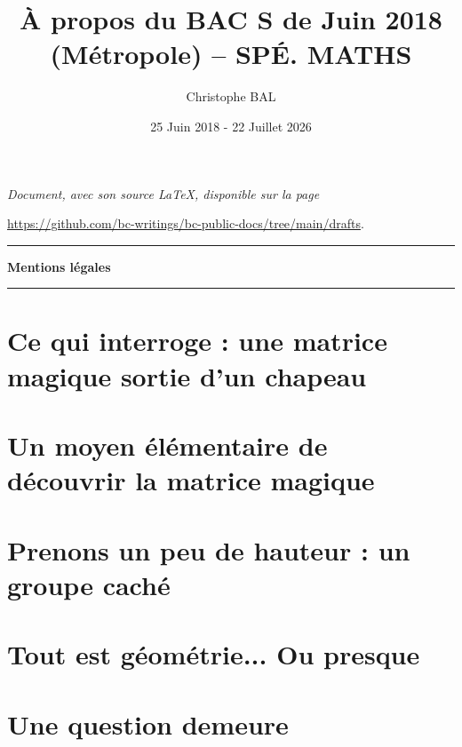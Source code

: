 \documentclass[12pt]{amsart}
\newcommand\squote[1]{\og #1 \fg{}}
\begin{document}
\title{À propos du BAC S de Juin 2018 (Métropole) -- SPÉ. MATHS}
\author{Christophe BAL}
\date{25 Juin 2018 - 22 Juillet 2026}
\maketitle


\begin{center}
	\itshape
	Document, avec son source \LaTeX, disponible sur la page

	\url{https://github.com/bc-writings/bc-public-docs/tree/main/drafts}.
\end{center}


\bigskip


\begin{center}
	\hrule\vspace{.3em}
	{
		\fontsize{1.35em}{1em}\selectfont
		\textbf{Mentions \og légales \fg}
	}

	\vspace{0.45em}
	\doclicenseThis
	\hrule
\end{center}



\setcounter{tocdepth}{2}
\tableofcontents



\section{Ce qui interroge : une matrice \squote{magique} sortie d'un chapeau}





\section{Un moyen élémentaire de découvrir la matrice \squote{magique}}





\section{Prenons un peu de hauteur : un groupe \squote{caché}}





\section{Tout est géométrie... Ou presque}





\section{Une question demeure}


\end{document}
